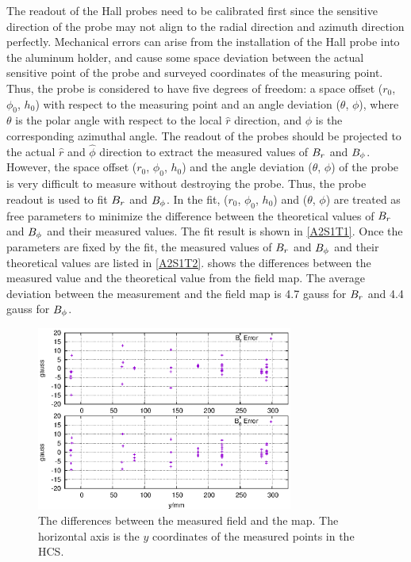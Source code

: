 The readout of the Hall probes need to be calibrated first since the sensitive direction of the probe may not align to the radial direction and azimuth direction perfectly. Mechanical errors can arise from the installation of the Hall probe into the aluminum holder, and cause some space deviation between the actual sensitive point of the probe and surveyed coordinates of the measuring point. Thus, the probe is considered to have five degrees of freedom: a space offset ($r_0$, $\phi_0$, $h_0$) with respect to the measuring point and an angle deviation ($\theta$, $\phi$), where $\theta$ is the polar angle with respect to the local $\hat{r}$ direction, and $\phi$ is the corresponding azimuthal angle. The readout of the probes should be projected to the actual $\hat{r}$ and $\hat{\phi}$ direction to extract the measured values of $B_r$ and $B_{\phi}$. However, the space offset ($r_0$, $\phi_0$, $h_0$) and the angle deviation ($\theta$, $\phi$) of the probe is very difficult to measure without destroying the probe. Thus, the probe readout is used to fit $B_r$ and $B_{\phi}$. In the fit, ($r_0$, $\phi_0$, $h_0$) and ($\theta$, $\phi$) are treated as free parameters to minimize the difference between the theoretical values of $B_r$ and $B_{\phi}$ and their measured values. The fit result is shown in \cref{A2S1T1}. Once the parameters are fixed by the fit, the measured values of $B_r$ and $B_{\phi}$ and their theoretical values are listed in \cref{A2S1T2}.  shows the differences between the measured value and the theoretical value from the field map. The average deviation between the measurement and the field map is 4.7 gauss for $B_r$ and 4.4 gauss for $B_{\phi}$.

\begin{figure}[tb!]
  \centering
  \includegraphics[width=0.75\textwidth]{figs/target-field-mapping-error}
  \caption[The differences between the measured field and the map.]{The differences between the measured field and the map. The horizontal axis is the $y$ coordinates of the measured points in the HCS. \label{A2S1F2}}
\end{figure}

